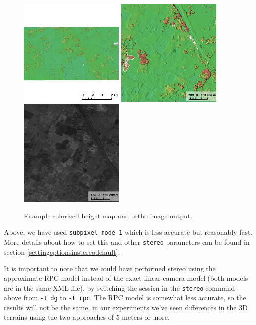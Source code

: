 \begin{figure}[h!]
\centering
  \includegraphics[width=2.0in]{images/examples/dg/DigitalGlobeContext.png}
  \includegraphics[width=2.0in]{images/examples/dg/DigitalGlobeCloseUp.png}
  \includegraphics[width=2.0in]{images/examples/dg/DigitalGlobeCloseUpDRG.png}
\caption{Example colorized height map and ortho image output.}
\label{fig:dg-nomap-example}
\end{figure}

Above, we have used \texttt{subpixel-mode 1} which is less accurate but
reasonably fast.  More details about how to set this and other
\texttt{stereo} parameters can be found in section
\ref{settingoptionsinstereodefault}.

It is important to note that we could have performed stereo using the
approximate RPC model instead of the exact linear camera model (both
models are in the same XML file), by switching the session in the
\texttt{stereo} command above from \texttt{-t dg} to \texttt{-t
rpc}. The RPC model is somewhat less accurate, so the results will not
be the same, in our experiments we've seen differences in the 3D
terrains using the two approaches of 5 meters or more.

